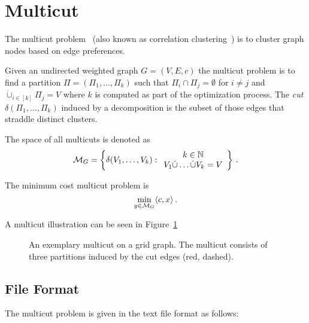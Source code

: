 \section{Multicut}
\label{sec:multicut}

The multicut problem~\cite{chopra1993partition} (also known as correlation clustering~\cite{demaine2006correlation}) is to cluster graph nodes based on edge preferences.

\begin{definition}[Multicut]
Given an undirected weighted graph $G=(V,E,c)$ the multicut problem is to find a partition $\Pi = (\Pi_1,\ldots,\Pi_k)$ such that $\Pi_i \cap \Pi_j=\emptyset$ for $i \neq j$ and $\dot{\cup}_{i\in[k]} \Pi_j = V$ where $k$ is computed as part of the optimization process.
The \emph{cut} $\delta(\Pi_1,\ldots,\Pi_k)$ induced by a decomposition is the subset of those edges that straddle distinct clusters.

The space of all multicuts is denoted as
\begin{equation}
  \mathcal{M}_G = \left\{ \delta(V_1,\ldots,V_k) : 
\begin{array}{c}
  k \in \mathbb{N} \\
  V_1 \dot\cup \ldots \dot\cup V_k = V
\end{array} \right\}\,.
\end{equation} 

The minimum cost multicut problem is
\begin{equation}
  \label{eq:multicut}
  \min_{y \in \mathcal{M}_G} \langle c, x \rangle\,.
\end{equation} 
\end{definition}

A multicut illustration can be seen in Figure~\ref{fig:multicut-illustration}

\begin{figure}[H]
    \centering
    \scalebox{0.7}{  }
    \caption{
    An exemplary multicut on a grid graph.
    The multicut consists of three partitions induced by the cut edges (red, dashed).
    }
    \label{fig:multicut-illustration}
\end{figure}

\subsection{File Format}
The multicut problem is given in the text file format as follows:

